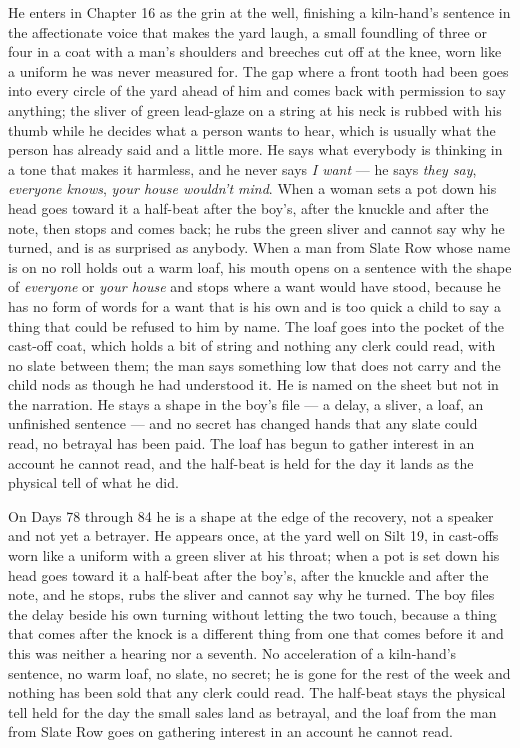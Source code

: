 \documentclass{design/chronicle}
\begin{document}
{
He enters in Chapter 16 as the grin at the well, finishing a kiln-hand’s sentence in the affectionate voice that makes the yard laugh, a small foundling of three or four in a coat with a man’s shoulders and breeches cut off at the knee, worn like a uniform he was never measured for. The gap where a front tooth had been goes into every circle of the yard ahead of him and comes back with permission to say anything; the sliver of green lead-glaze on a string at his neck is rubbed with his thumb while he decides what a person wants to hear, which is usually what the person has already said and a little more. He says what everybody is thinking in a tone that makes it harmless, and he never says \emph{I want} --- he says \emph{they say}, \emph{everyone knows}, \emph{your house wouldn’t mind}. When a woman sets a pot down his head goes toward it a half-beat after the boy’s, after the knuckle and after the note, then stops and comes back; he rubs the green sliver and cannot say why he turned, and is as surprised as anybody. When a man from Slate Row whose name is on no roll holds out a warm loaf, his mouth opens on a sentence with the shape of \emph{everyone} or \emph{your house} and stops where a want would have stood, because he has no form of words for a want that is his own and is too quick a child to say a thing that could be refused to him by name. The loaf goes into the pocket of the cast-off coat, which holds a bit of string and nothing any clerk could read, with no slate between them; the man says something low that does not carry and the child nods as though he had understood it. He is named on the sheet but not in the narration. He stays a shape in the boy’s file --- a delay, a sliver, a loaf, an unfinished sentence --- and no secret has changed hands that any slate could read, no betrayal has been paid. The loaf has begun to gather interest in an account he cannot read, and the half-beat is held for the day it lands as the physical tell of what he did.

On Days 78 through 84 he is a shape at the edge of the recovery, not a speaker and not yet a betrayer. He appears once, at the yard well on Silt 19, in cast-offs worn like a uniform with a green sliver at his throat; when a pot is set down his head goes toward it a half-beat after the boy’s, after the knuckle and after the note, and he stops, rubs the sliver and cannot say why he turned. The boy files the delay beside his own turning without letting the two touch, because a thing that comes after the knock is a different thing from one that comes before it and this was neither a hearing nor a seventh. No acceleration of a kiln-hand’s sentence, no warm loaf, no slate, no secret; he is gone for the rest of the week and nothing has been sold that any clerk could read. The half-beat stays the physical tell held for the day the small sales land as betrayal, and the loaf from the man from Slate Row goes on gathering interest in an account he cannot read.

}
\end{document}
